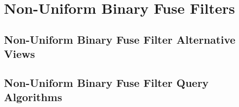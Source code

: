 \section{Non-Uniform Binary Fuse Filters}

\subsection{Non-Uniform Binary Fuse Filter Alternative Views}
\label{sec:csc592_bigdata_alt_views}





\subsection{Non-Uniform Binary Fuse Filter Query Algorithms}
\label{sec:csc592_bigdata_contains_impl}






